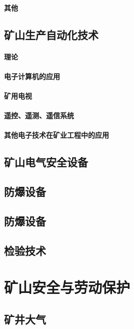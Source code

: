 \documentclass[UTF8]{../../ApplicationUniverse}
\begin{document}
        \subsubsection{其他}
\section{矿山生产自动化技术}
    \subsubsection{理论}
    \subsubsection{电子计算机的应用}
    \subsubsection{矿用电视}
    \subsubsection{遥控、遥测、遥信系统}
    \subsubsection{其他电子技术在矿业工程中的应用}
\section{矿山电气安全设备}
\section{防爆设备}
\section{防爆设备}
\section{检验技术}











\chapter{矿山安全与劳动保护}
\section{矿井大气}
\end{document}
